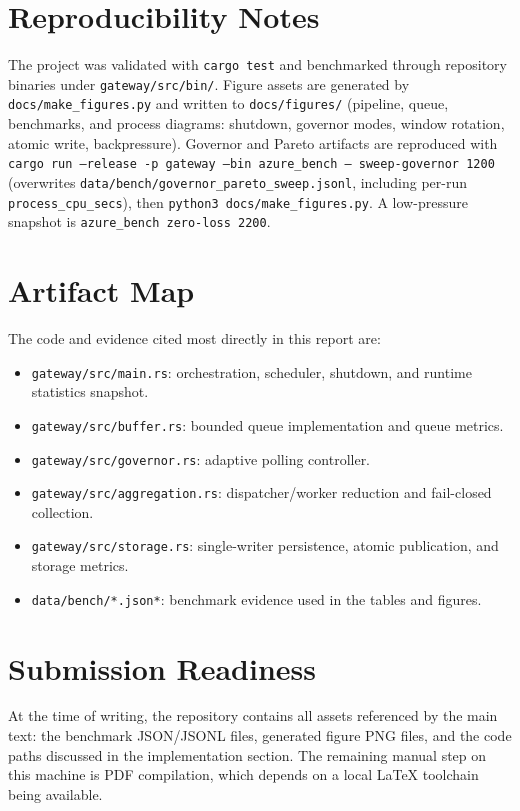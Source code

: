 \documentclass[11pt]{article}
\begin{document}
\appendix
\section{Reproducibility Notes}
The project was validated with \texttt{cargo test} and benchmarked through repository binaries under \texttt{gateway/src/bin/}. Figure assets are generated by \texttt{docs/make\_figures.py} and written to \texttt{docs/figures/} (pipeline, queue, benchmarks, and process diagrams: shutdown, governor modes, window rotation, atomic write, backpressure). Governor and Pareto artifacts are reproduced with \texttt{cargo run --release -p gateway --bin azure\_bench -- sweep-governor 1200} (overwrites \texttt{data/bench/governor\_pareto\_sweep.jsonl}, including per-run \texttt{process\_cpu\_secs}), then \texttt{python3 docs/make\_figures.py}. A low-pressure snapshot is \texttt{azure\_bench zero-loss 2200}.

\section{Artifact Map}
The code and evidence cited most directly in this report are:
\begin{itemize}
\item \texttt{gateway/src/main.rs}: orchestration, scheduler, shutdown, and runtime statistics snapshot.
\item \texttt{gateway/src/buffer.rs}: bounded queue implementation and queue metrics.
\item \texttt{gateway/src/governor.rs}: adaptive polling controller.
\item \texttt{gateway/src/aggregation.rs}: dispatcher/worker reduction and fail-closed collection.
\item \texttt{gateway/src/storage.rs}: single-writer persistence, atomic publication, and storage metrics.
\item \texttt{data/bench/*.json*}: benchmark evidence used in the tables and figures.
\end{itemize}

\section{Submission Readiness}
At the time of writing, the repository contains all assets referenced by the main text: the benchmark JSON/JSONL files, generated figure PNG files, and the code paths discussed in the implementation section. The remaining manual step on this machine is PDF compilation, which depends on a local LaTeX toolchain being available.
\end{document}
